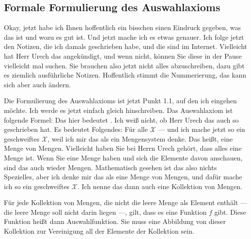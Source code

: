 \subsection{Formale Formulierung des Auswahlaxioms}

\begin{spoken-clean}[00:10:15 - 00:12:30]
Okay, jetzt habe ich Ihnen hoffentlich ein bisschen einen Eindruck gegeben, was das ist und wozu es gut ist. Und jetzt mache ich es etwas genauer. Ich folge jetzt den Notizen, die ich damals geschrieben habe, und die sind im Internet. Vielleicht hat Herr Urech das angekündigt, und wenn nicht, können Sie diese in der Pause vielleicht mal suchen. Sie brauchen also jetzt nicht alles abzuschreiben, dazu gibt es ziemlich ausführliche Notizen. Hoffentlich stimmt die Nummerierung, das kann sich aber auch ändern.

Die Formulierung des Auswahlaxioms ist jetzt Punkt 1.1, auf den ich eingehen möchte. Ich werde es jetzt einfach gleich hinschreiben. Das Auswahlaxiom ist folgende Formel: Das hier bedeutet . Ich weiß nicht, ob Herr Urech das auch so geschrieben hat. Es bedeutet Folgendes: Für alle $\mathcal{X}$ --- und ich mache jetzt so ein geschweiftes $\mathcal{X}$, weil ich mir das als ein Mengensystem denke. Das heißt, eine Menge von Mengen. Vielleicht haben Sie bei Herrn Urech gehört, dass alles eine Menge ist. Wenn Sie eine Menge haben und sich die Elemente davon anschauen, sind das auch wieder Mengen. Mathematisch gesehen ist das also nichts Spezielles, aber ich denke mir das als eine Menge von Mengen, und dafür mache ich so ein geschweiftes $\mathcal{X}$. Ich nenne das dann auch eine Kollektion von Mengen. 

Für jede Kollektion von Mengen, die nicht die leere Menge als Element enthält --- die leere Menge soll nicht darin liegen ---, gilt, dass es eine Funktion $f$ gibt. Diese Funktion heißt dann Auswahlfunktion. Sie muss eine Abbildung von dieser Kollektion zur Vereinigung all der Elemente der Kollektion sein.
\end{spoken-clean}

